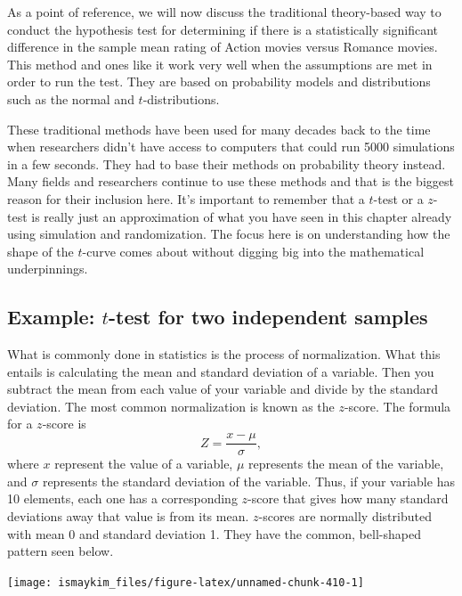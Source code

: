 \documentclass[12pt,]{krantz}
\begin{document}
As a point of reference, we will now discuss the traditional
theory-based way to conduct the hypothesis test for determining if there
is a statistically significant difference in the sample mean rating of
Action movies versus Romance movies. This method and ones like it work
very well when the assumptions are met in order to run the test. They
are based on probability models and distributions such as the normal and
\(t\)-distributions.

These traditional methods have been used for many decades back to the
time when researchers didn't have access to computers that could run
5000 simulations in a few seconds. They had to base their methods on
probability theory instead. Many fields and researchers continue to use
these methods and that is the biggest reason for their inclusion here.
It's important to remember that a \(t\)-test or a \(z\)-test is really
just an approximation of what you have seen in this chapter already
using simulation and randomization. The focus here is on understanding
how the shape of the \(t\)-curve comes about without digging big into
the mathematical underpinnings.

\subsection{\texorpdfstring{Example: \(t\)-test for two independent
samples}{Example: t-test for two independent samples}}\label{example-t-test-for-two-independent-samples}

What is commonly done in statistics is the process of normalization.
What this entails is calculating the mean and standard deviation of a
variable. Then you subtract the mean from each value of your variable
and divide by the standard deviation. The most common normalization is
known as the \(z\)-score. The formula for a \(z\)-score is
\[Z = \frac{x - \mu}{\sigma},\] where \(x\) represent the value of a
variable, \(\mu\) represents the mean of the variable, and \(\sigma\)
represents the standard deviation of the variable. Thus, if your
variable has 10 elements, each one has a corresponding \(z\)-score that
gives how many standard deviations away that value is from its mean.
\(z\)-scores are normally distributed with mean 0 and standard deviation
1. They have the common, bell-shaped pattern seen below.

\begin{center}\texttt{[image: ismaykim\_files/figure-latex/unnamed-chunk-410-1]} \end{center}
\end{document}
